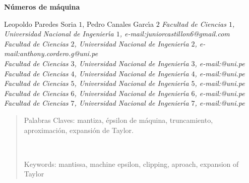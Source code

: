 \documentclass[10pt,a4paper]{article}
\begin{document}
\begin{center}
 {\Large \textbf{N\'umeros de m\'aquina }}
\end{center}
\begin{center}
 Leopoldo Paredes Soria $1$, Pedro Canales Garc\'{\i}a $2$\vskip12pt
{\it Facultad de Ciencias $1$, Universidad Nacional de Ingenier\'{\i}a $1$, e-mail:juniorcastillon6@gmail.com \\
Facultad de Ciencias $2$, Universidad Nacional de Ingenier\'{\i}a $2$, e-mail:anthony.cordero.g@uni.pe\\
Facultad de Ciencias $3$, Universidad Nacional de Ingenier\'{\i}a $3$, e-mail:@uni.pe\\
Facultad de Ciencias $4$, Universidad Nacional de Ingenier\'{\i}a $4$, e-mail:@uni.pe\\
Facultad de Ciencias $5$, Universidad Nacional de Ingenier\'{\i}a $5$, e-mail:@uni.pe\\
Facultad de Ciencias $6$, Universidad Nacional de Ingenier\'{\i}a $6$, e-mail:@uni.pe\\
Facultad de Ciencias $7$, Universidad Nacional de Ingenier\'{\i}a $7$, e-mail:@uni.pe\\
}
\end{center}
\begin{quotation}
{\small

Palabras Claves: mantiza, \'epsilon de m\'aquina, truncamiento, aproximaci\'on, expansi\'on de Taylor.
}\\
{\small
\hspace*{0.5cm} 

Keywords: mantissa, machine epsilon, clipping, aproach, expansion of Taylor \\ 

}
\end{quotation}
\end{document}
